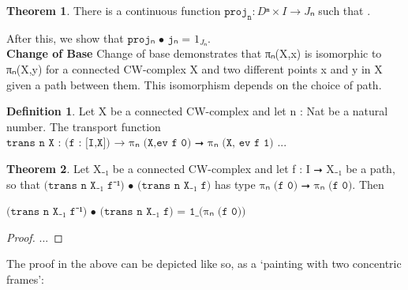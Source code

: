 \documentclass{book}
\theoremstyle{definition}
\newtheorem{definition}{Definition}
\newtheorem{theorem}{Theorem}
\begin{document}
\begin{theorem}
There is a continuous function $\texttt{proj}_{\texttt{n}} : Dⁿ × I \rightarrow Jₙ$ such that .
\end{theorem}

After this, we show that $\texttt{projₙ • jₙ = }1_{Jₙ}$.\\

{\bf Change of Base} Change of base demonstrates that πₙ(X,x) is isomorphic to πₙ(X,y) for a connected CW-complex X and two different points x and y in X given a path between them. This isomorphism depends on the choice of path.

\begin{definition}
Let X be a connected CW-complex and let n : Nat be a natural number. The transport function $\texttt{trans\ n\ X : (f : [I,X])  → πₙ (X,ev f 0) ⭢ πₙ (X, ev f 1)}$ ...
\end{definition}

\begin{theorem}
Let X₋₁ be a connected CW-complex and let f : I ⭢ X₋₁ be a path, so that $\texttt{(trans\ n X₋₁ f⁻¹) • (trans\ n X₋₁ f)}$ has type $\texttt{πₙ (f 0) ⭢ πₙ (f 0)}$. Then
\begin{center}
$\texttt{(trans\ n X₋₁ f⁻¹) • (trans\ n X₋₁ f) = 1\_(πₙ (f 0))}$
\end{center}
\end{theorem}

\begin{proof}
...
\end{proof}

The proof in the above can be depicted like so, as a `painting with two concentric frames':
\end{document}

